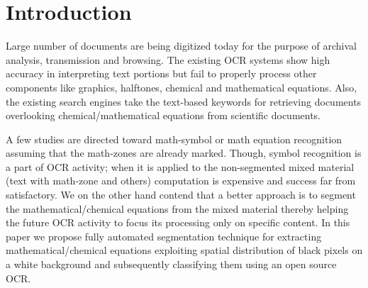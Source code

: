 \documentclass[12pt]{IEEEtran}
\begin{document}
% 
% 

\section{Introduction}
\label{sec:intro}
  Large number of documents are being digitized today for the purpose of archival analysis, transmission and browsing. 
  The existing OCR systems show high accuracy in interpreting text portions but fail to properly process other
  components like graphics, halftones, chemical and mathematical  equations.
  Also, the existing search engines take the text-based keywords for retrieving documents overlooking chemical/mathematical
  equations from scientific documents.
  
  A few studies \cite{blostein_97, chan_2000, Garain_07} are directed toward math-symbol or math equation recognition 
  assuming that the math-zones are already marked. Though, symbol recognition is a part of OCR activity; when it is applied to
  the non-segmented mixed material (text with math-zone and others) computation is expensive and success far from satisfactory.
  We on the other hand contend that a better approach is to segment the mathematical/chemical equations from the mixed material
  thereby helping the future OCR activity to focus its processing only on specific content.
  In this paper we propose fully automated segmentation technique for extracting
  mathematical/chemical equations  exploiting spatial distribution of black pixels on a white background and subsequently
  classifying them using an open source OCR.
  
\end{document}
